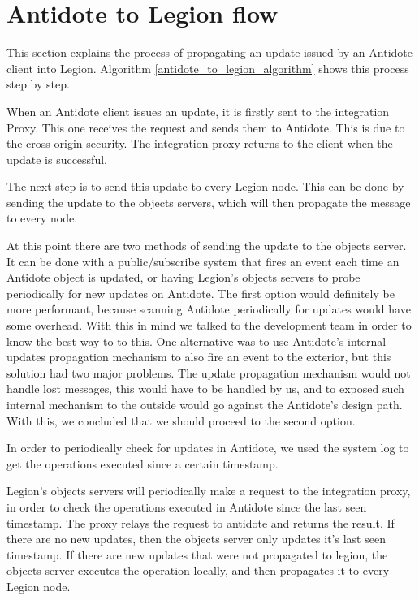 \section{Antidote to Legion flow}
\label{sec:antidote_to_legion_flow}
This section explains the process of propagating an update issued by an Antidote client into Legion. Algorithm \ref{antidote_to_legion_algorithm} shows this process step by step.\par
	When an Antidote client issues an update, it is firstly sent to the integration Proxy. This one receives the request and sends them to Antidote. This is due to the cross-origin security. The integration proxy returns to the client when the update is successful.\par
	The next step is to send this update to every Legion node. This can be done by sending the update to the objects servers, which will then propagate the message to every node.\par
	At this point there are two methods of sending the update to the objects server. It can be done with a public/subscribe system that fires an event each time an Antidote object is updated, or having Legion's objects servers to probe periodically for new updates on Antidote. The first option would definitely be more performant, because scanning Antidote periodically for updates would have some overhead. With this in mind we talked to the development team in order to know the best way to to this. One alternative was to use Antidote's internal updates propagation mechanism to also fire an event to the exterior, but this solution had two major problems. The update propagation mechanism would not handle lost messages, this would have to be handled by us, and to exposed such internal mechanism to the outside would go against the Antidote's design path. With this, we concluded that we should proceed to the second option.\par
	In order to periodically check for updates in Antidote, we used the system log to get the operations executed since a certain timestamp.\par
	Legion's objects servers will periodically make a request to the integration proxy, in order to check the operations executed in Antidote since the last seen timestamp. The proxy relays the request to antidote and returns the result. If there are no new updates, then the objects server only updates it's last seen timestamp. If there are new updates that were not propagated to legion, the objects server executes the operation locally, and then propagates it to every Legion node.
	

